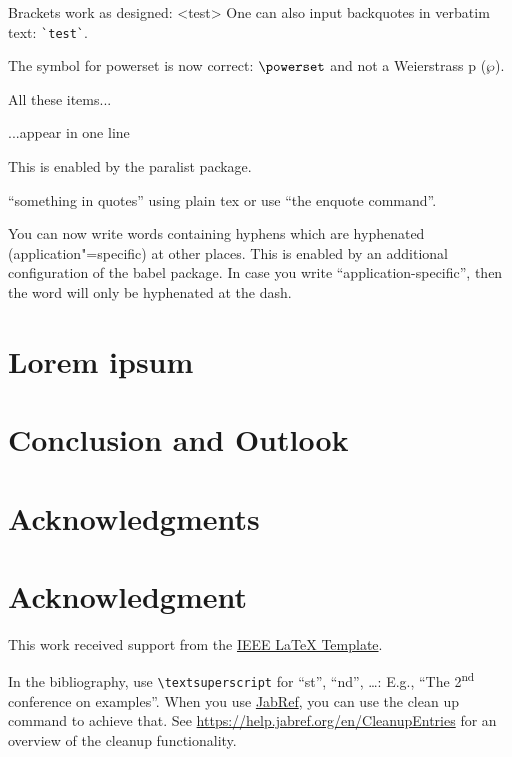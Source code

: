 \documentclass[conference]{IEEEtran}[2015/08/26]
\begin{document}
Brackets work as designed:
<test>
One can also input backquotes in verbatim text: \verb|`test`|.

The symbol for powerset is now correct: $\powerset$ and not a Weierstrass p ($\wp$).

\begin{inparaenum}
  \item All these items...
  \item ...appear in one line
  \item This is enabled by the paralist package.
\end{inparaenum}

``something in quotes'' using plain tex or use \enquote{the enquote command}.

You can now write words containing hyphens which are hyphenated (application"=specific) at other places.
This is enabled by an additional configuration of the babel package.
In case you write \enquote{application-specific}, then the word will only be hyphenated at the dash.

\section{Lorem ipsum}
\label{sec:loremipsum}
\lipsum[1-4]

\section{Conclusion and Outlook}
\label{sec:outlook}

\blindtext

\ifCLASSOPTIONcompsoc
  \section*{Acknowledgments}
\else
  \section*{Acknowledgment}
\fi

This work received support from the \href{https://latextemplates.github.io/IEEE/}{IEEE LaTeX Template}.


In the bibliography, use \texttt{\textbackslash textsuperscript} for ``st'', ``nd'', \ldots:
E.g., \enquote{The 2\textsuperscript{nd} conference on examples}.
When you use \href{https://www.jabref.org}{JabRef}, you can use the clean up command to achieve that.
See \url{https://help.jabref.org/en/CleanupEntries} for an overview of the cleanup functionality.
\end{document}
